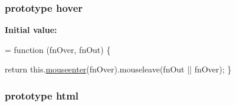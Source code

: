 \subsubsection[{\texorpdfstring{hover}{hover}}]{ {\bf prototype} hover}\hypertarget{jquery-2_82_81-vsdoc_8js_a89022f117a4ab5bd5f578a26a7eaafa5}{}\label{jquery-2_82_81-vsdoc_8js_a89022f117a4ab5bd5f578a26a7eaafa5}
{\bfseries Initial value\+:}
\begin{DoxyCode}
= \textcolor{keyword}{function} (fnOver, fnOut) \{
        

        \textcolor{keywordflow}{return} this.\hyperlink{jquery-2_82_81-vsdoc_8js_a762f67ea0a9dd89f27dbe2b23d9f91b9}{mouseenter}(fnOver).mouseleave(fnOut || fnOver);
    \}
\end{DoxyCode}
\subsubsection[{\texorpdfstring{html}{html}}]{ {\bf prototype} html}\hypertarget{jquery-2_82_81-vsdoc_8js_a54a716632718016dd4e400e83a0970e2}{}\label{jquery-2_82_81-vsdoc_8js_a54a716632718016dd4e400e83a0970e2}
